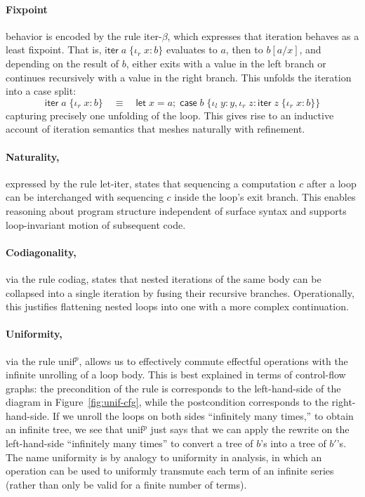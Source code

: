 \documentclass[acmsmall,screen,review]{acmart}
\newcommand{\ms}[1]{\ensuremath{\mathsf{#1}}}
\newcommand{\lto}{:}
\newcommand{\linl}[1]{\iota_l\;{#1}}
\newcommand{\linr}[1]{\iota_r\;{#1}}
\newcommand{\letexpr}[3]{\ensuremath{\ms{let}\;#1 = #2;\;#3}}
\newcommand{\caseexpr}[5]{\ms{case}\;#1\;\{\linl{#2} \lto #3, \linr{#4} \lto #5\}}
\newcommand{\liter}[3]{\ms{iter}\;#1\;\{ \linr{#2} \lto #3 \}}
\begin{document}
\paragraph{Fixpoint} behavior is encoded by the rule \textsf{iter-$\beta$}, which expresses that
iteration behaves as a least fixpoint. That is, $\liter{a}{x}{b}$ evaluates to $a$, then to
$b[a/x]$, and depending on the result of $b$, either exits with a value in the left branch or
continues recursively with a value in the right branch. This unfolds the iteration into a case
split:
\[
\liter{a}{x}{b} \quad \equiv \quad \letexpr{x}{a}{\caseexpr{b}{y}{y}{z}{\liter{z}{x}{b}}}
\]
capturing precisely one unfolding of the loop. This gives rise to an inductive account of iteration
semantics that meshes naturally with refinement.
%
\paragraph{Naturality,} expressed by the rule \textsf{let-iter}, states that sequencing a
computation $c$ after a loop can be interchanged with sequencing $c$ inside the loop’s exit branch.
This enables reasoning about program structure independent of surface syntax and supports
loop-invariant motion of subsequent code.
%
\paragraph{Codiagonality,} via the rule \textsf{codiag}, states that nested iterations of the same
body can be collapsed into a single iteration by fusing their recursive branches. Operationally,
this justifies flattening nested loops into one with a more complex continuation.
%
\paragraph{Uniformity,} via the rule \textsf{unif$^p$}, allows us to effectively commute effectful
operations with the infinite unrolling of a loop body. This is best explained in terms of
control-flow graphs: the precondition of the rule is corresponds to the left-hand-side of the
diagram in Figure~\ref{fig:unif-cfg}, while the postcondition corresponds to the right-hand-side. If
we unroll the loops on both sides ``infinitely many times,'' to obtain an infinite tree, we see that
\textsf{unif$^p$} just says that we can apply the rewrite on the left-hand-side ``infinitely many
times'' to convert a tree of $b$'s into a tree of $b'$'s. The name uniformity is by analogy to
uniformity in analysis, in which an operation can be used to uniformly transmute each term of an
infinite series (rather than only be valid for a finite number of terms).
\end{document}
